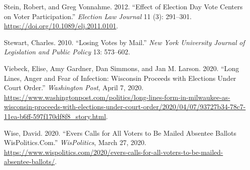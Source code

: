 \documentclass[
  12pt,
]{article}
\newlength{\cslhangindent}
\newenvironment{cslreferences}%
  {\setlength{\parindent}{0pt}%
  \everypar{\setlength{\hangindent}{\cslhangindent}}\ignorespaces}%
  {\par}
\begin{document}
\begin{cslreferences}
\leavevmode\hypertarget{ref-Stein2012}{}%
Stein, Robert, and Greg Vonnahme. 2012. ``Effect of Election Day Vote Centers on Voter Participation.'' \emph{Election Law Journal} 11 (3): 291--301. \url{https://doi.org/10.1089/elj.2011.0101}.

\leavevmode\hypertarget{ref-Stewart2010}{}%
Stewart, Charles. 2010. ``Losing Votes by Mail.'' \emph{New York University Journal of Legislation and Public Policy} 13: 573--602.

\leavevmode\hypertarget{ref-Viebeck2020}{}%
Viebeck, Elise, Amy Gardner, Dan Simmons, and Jan M. Larson. 2020. ``Long Lines, Anger and Fear of Infection: Wisconsin Proceeds with Elections Under Court Order.'' \emph{Washington Post}, April 7, 2020. \url{https://www.washingtonpost.com/politics/long-lines-form-in-milwaukee-as-wisconsin-proceeds-with-elections-under-court-order/2020/04/07/93727b34-78c7-11ea-b6ff-597f170df8f8_story.html}.

\leavevmode\hypertarget{ref-Wise2020}{}%
Wise, David. 2020. ``Evers Calls for All Voters to Be Mailed Absentee Ballots \textbar{} WisPolitics.Com.'' \emph{WisPolitics}, March 27, 2020. \url{https://www.wispolitics.com/2020/evers-calls-for-all-voters-to-be-mailed-absentee-ballots/}.
\end{cslreferences}
\end{document}
